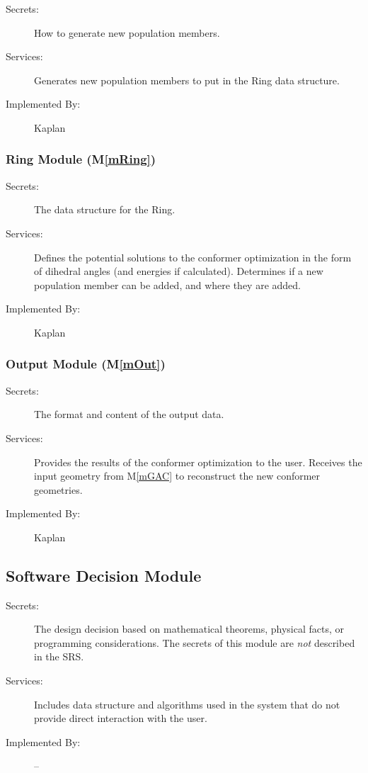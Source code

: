 \documentclass[12pt, titlepage]{article}
\newcommand{\mref}[1]{M\ref{#1}}
\newcommand{\progname}{Kaplan} %
\begin{document}
\begin{description}
	\item[Secrets:] How to generate new population members.
	\item[Services:] Generates new population members to put in the Ring data 
	structure.
	\item[Implemented By:] \progname{}
\end{description}

\subsubsection{Ring Module (\mref{mRing})}

\begin{description}
	\item[Secrets:] The data structure for the Ring.
	\item[Services:] Defines the potential solutions to the conformer 
	optimization in the form of dihedral angles (and energies if calculated). 
	Determines if a new population member can be added, and where they are 
	added.
	\item[Implemented By:] \progname{}
\end{description}

\subsubsection{Output Module (\mref{mOut})}

\begin{description}
	\item[Secrets:] The format and content of the output data.
	\item[Services:] Provides the results of the conformer optimization to the 
	user. Receives the input geometry from \mref{mGAC} to reconstruct the new 
	conformer geometries. 
	\item[Implemented By:] \progname{}
\end{description}

\subsection{Software Decision Module}

\begin{description}
\item[Secrets:] The design decision based on mathematical theorems, physical
  facts, or programming considerations. The secrets of this module are
  \emph{not} described in the SRS.
\item[Services:] Includes data structure and algorithms used in the system that
  do not provide direct interaction with the user. 
\item[Implemented By:] --
\end{description}
\end{document}
